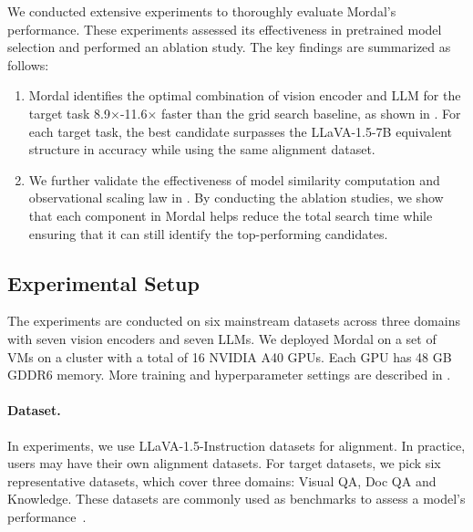 We conducted extensive experiments to thoroughly evaluate Mordal's performance. These experiments assessed its effectiveness in pretrained model selection and performed an ablation study. The key findings are summarized as follows:
\begin{enumerate}
    \item Mordal identifies the optimal combination of vision encoder and LLM for the target task 8.9$\times$-11.6$\times$ faster than the grid search baseline, as shown in . For each target task, the best candidate surpasses the LLaVA-1.5-7B equivalent structure in accuracy while using the same alignment dataset. 
    \item We further validate the effectiveness of model similarity computation and observational scaling law in . By conducting the ablation studies, we show that each component in Mordal helps reduce the total search time while ensuring that it can still identify the top-performing candidates.  
\end{enumerate}



\subsection{Experimental Setup}
The experiments are conducted on six mainstream datasets across three domains with seven vision encoders and seven LLMs. We deployed Mordal on a set of VMs on a cluster with a total of 16 NVIDIA A40 GPUs. Each GPU has 48 GB GDDR6 memory. More training and hyperparameter settings are described in .

\paragraph{Dataset.} In experiments, we use LLaVA-1.5-Instruction datasets \cite{liu2023improved} for alignment. In practice, users may have their own alignment datasets. For target datasets, we pick six representative datasets, which cover three domains: Visual QA, Doc QA and Knowledge. These datasets are commonly used as benchmarks to assess a model's performance~\cite{zhang2024lmms}. 

